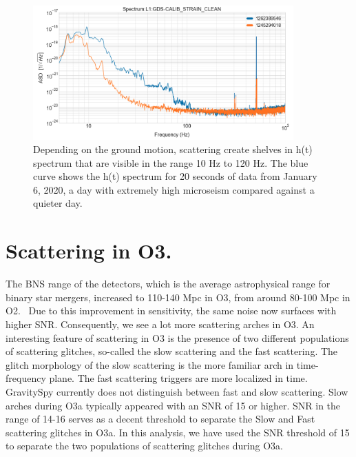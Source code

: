 \documentclass[12pt]{iopart}
\begin{document}
\begin{figure}[h]
    \centering
    \includegraphics[width=10cm]{scatshelf4.png}
    \caption{ Depending on the ground motion, scattering create shelves in h(t) spectrum that are visible in the range 10 Hz to 120 Hz. The blue curve shows the h(t) spectrum for 20 seconds of data from January 6, 2020, a day with extremely high microseism compared against a quieter day.}
    \label{fig:scatshelf1}
\end{figure}
\section{Scattering in O3.}\label{scatino3}
The BNS range of the detectors, which is the average astrophysical range for binary star mergers, increased to 110-140 Mpc in O3, from around 80-100 Mpc in O2.~\cite{prospect} Due to this improvement in sensitivity, the same noise now surfaces with higher SNR.
Consequently, we see a lot more scattering arches in O3. An interesting feature of scattering in O3 is the presence of two different populations of scattering glitches, so-called the slow scattering and the fast scattering. The glitch morphology of the slow scattering is the more familiar arch in time-frequency plane. The fast scattering triggers are more localized in time. GravitySpy currently does not distinguish between fast and slow scattering. Slow arches during O3a  typically appeared with an SNR of 15 or higher. SNR in the range of 14-16 serves as a decent threshold to separate the Slow and Fast scattering glitches in O3a. In this analysis, we have used the SNR threshold of 15 to separate the two populations of scattering glitches during O3a.
\end{document}
